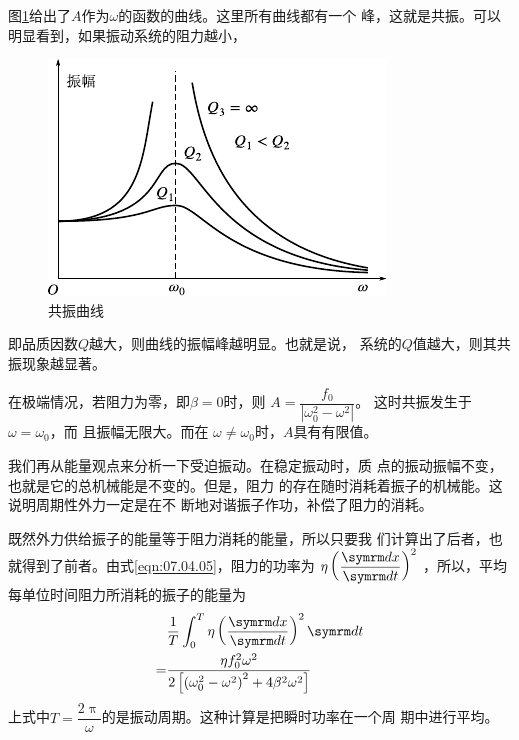 图\ref{fig:07.09}\;给出了$ A $作为$ \omega $的函数的曲线。这里所有曲线都有一个
峰，这就是共振。可以明显看到，如果振动系统的阻力越小，
\begin{figure}
  \centering
  \includegraphics{figure/fig07.09}
  \caption{共振曲线}
  \label{fig:07.09}
\end{figure}
即品质因数$ Q $越大，则曲线的振幅峰越明显。也就是说，
系统的$ Q $值越大，则其共振现象越显著。

在极端情况，若阻力为零，即$ \beta = 0 $时，则
$ A = \dfrac { f _ { 0 } } { \left| \omega_{ 0 } ^ { 2 } - \omega ^ { 2 } \right| } $。
这时共振发生于$ \omega = \omega _ { 0 } $，而
且振幅无限大。而在
$ \omega \ne \omega _ { 0 } $时，$ A $具有有限值。

我们再从能量观点来分析一下受迫振动。在稳定振动时，质
点的振动振幅不变，也就是它的总机械能是不变的。但是，阻力
的存在随时消耗着振子的机械能。这说明周期性外力一定是在不
断地对谐振子作功，补偿了阻力的消耗。

既然外力供给振子的能量等于阻力消耗的能量，所以只要我
们计算出了后者，也就得到了前者。由式\eqref{eqn:07.04.05}，阻力的功率为
$ \eta \left( \dfrac { \dif x } { \dif t } \right) ^ { 2 } $
，所以，平均每单位时间阻力所消耗的振子的能量为
\begin{equation}\label{eqn:07.05.06}
  \begin{aligned}
      & \frac { 1 } { T } \int _ { 0 } ^ { T } \eta  \left( \frac { \dif x } { \dif t } \right) ^ { 2 } \dif t                                                             \\
    = & \frac { \eta f _ { 0 } ^ { 2 } \omega ^ { 2 } } { 2 \left[ \left( \omega_{ 0 } ^ { 2 } - \omega ^ { 2 } \right) ^ { 2 } + 4 \beta ^ { 2 } \omega ^ { 2 } \right] }
  \end{aligned}
\end{equation}
上式中$ T = \dfrac { 2 \uppi } { \omega } $的是振动周期。这种计算是把瞬时功率在一个周
期中进行平均。

